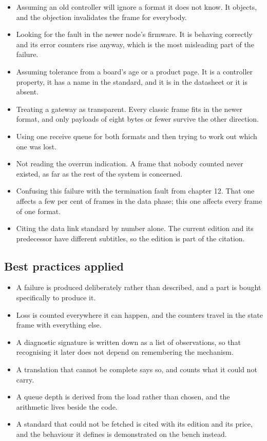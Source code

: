 \begin{itemize}
\item Assuming an old controller will ignore a format it does not know. It
objects, and the objection invalidates the frame for everybody.
\item Looking for the fault in the newer node's firmware. It is behaving
correctly and its error counters rise anyway, which is the most misleading part
of the failure.
\item Assuming tolerance from a board's age or a product page. It is a
controller property, it has a name in the standard, and it is in the datasheet
or it is absent.
\item Treating a gateway as transparent. Every classic frame fits in the newer
format, and only payloads of eight bytes or fewer survive the other direction.
\item Using one receive queue for both formats and then trying to work out which
one was lost.
\item Not reading the overrun indication. A frame that nobody counted never
existed, as far as the rest of the system is concerned.
\item Confusing this failure with the termination fault from chapter 12. That
one affects a few per cent of frames in the data phase; this one affects every
frame of one format.
\item Citing the data link standard by number alone. The current edition and
its predecessor have different subtitles, so the edition is part of the
citation.
\end{itemize}

\subsection*{Best practices applied}

\begin{itemize}
\item A failure is produced deliberately rather than described, and a part is
bought specifically to produce it.
\item Loss is counted everywhere it can happen, and the counters travel in the
state frame with everything else.
\item A diagnostic signature is written down as a list of observations, so that
recognising it later does not depend on remembering the mechanism.
\item A translation that cannot be complete says so, and counts what it could
not carry.
\item A queue depth is derived from the load rather than chosen, and the
arithmetic lives beside the code.
\item A standard that could not be fetched is cited with its edition and its
price, and the behaviour it defines is demonstrated on the bench instead.
\end{itemize}

